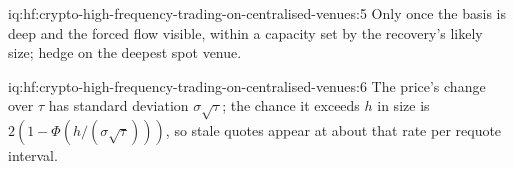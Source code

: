 \begin{solution}{iq:hf:crypto-high-frequency-trading-on-centralised-venues:5}
Only once the basis is deep and the forced flow visible, within a capacity set by the recovery's likely size; hedge on the deepest spot venue.
\end{solution}

\begin{solution}{iq:hf:crypto-high-frequency-trading-on-centralised-venues:6}
The price's change over $\tau$ has standard deviation $\sigma\sqrt\tau$; the chance it exceeds $h$ in size is $2(1-\Phi(h/(\sigma\sqrt\tau)))$,
so stale quotes appear at about that rate per requote interval.
\end{solution}
